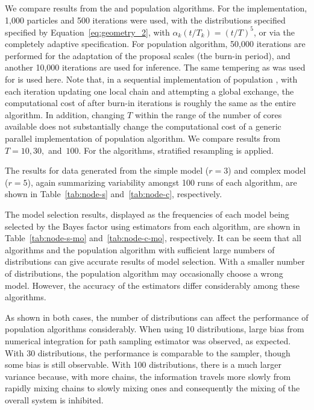 We compare results from the \smc[2] and population \mcmc algorithms. For the \smc implementation, 1,000 particles and 500 iterations were used, with the distributions specified specified by Equation~\eqref{eq:geometry_2}, with $\alpha_k(t/T_k) = (t/T)^5$, or via the completely adaptive specification. For population \mcmc algorithm, 50,000 iterations are performed for the adaptation of the proposal scales (the burn-in period), and another 10,000 iterations are used for inference. The same tempering as was used for \smc is used here. Note that, in a sequential implementation of population \mcmc, with each iteration updating one local chain and attempting a global exchange, the computational cost of after burn-in iterations is roughly the same as the entire \smc algorithm. In addition, changing $T$ within the range of the number of cores available does not substantially change the computational cost of a generic parallel implementation of population \mcmc algorithm. We compare results from $T = 10,30,$ and~$100$. For the \smc algorithms, stratified resampling is applied.

The results for data generated from the simple model ($r = 3$) and complex model ($r = 5$), again summarizing variability amongst 100 runs of each algorithm, are shown in Table~\ref{tab:node-s} and~\ref{tab:node-c}, respectively.
\begin{draftpar}
The model selection results, displayed as the frequencies of each model being selected by the Bayes factor using estimators from each algorithm, are shown in Table~\ref{tab:node-s-mo} and~\ref{tab:node-c-mo}, respectively. It can be seem that all \smc algorithms and the population \mcmc algorithm with sufficient large numbers of distributions can give accurate results of model selection. With a smaller number of distributions, the population \mcmc algorithm may occasionally choose a wrong model. However, the accuracy of the estimators differ considerably among these algorithms.
\end{draftpar}

\begingroup
\afterpage{\clearpage}
\endgroup

As shown in both cases, the number of distributions can affect the performance of population \mcmc algorithms considerably. When using 10 distributions, large bias from numerical integration for path sampling estimator was observed, as expected. With 30 distributions, the performance is comparable to the \smc[2] sampler, though some bias is still observable. With 100 distributions, there is a much larger variance because, with more chains, the information travels more slowly from rapidly mixing chains to slowly mixing ones and consequently the mixing of the overall system is inhibited.

